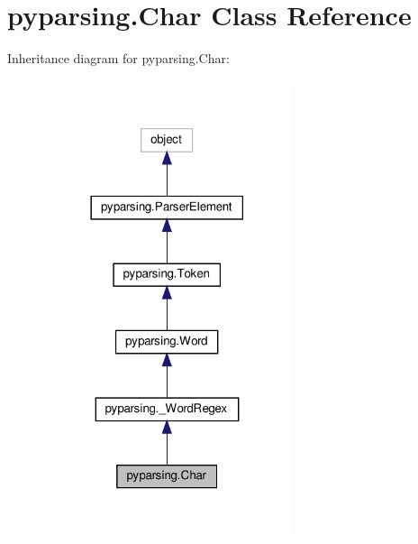 \hypertarget{classpyparsing_1_1Char}{}\section{pyparsing.\+Char Class Reference}
\label{classpyparsing_1_1Char}


Inheritance diagram for pyparsing.\+Char\+:
\nopagebreak
\begin{figure}[H]
\begin{center}
\leavevmode
\includegraphics[width=206pt]{classpyparsing_1_1Char__inherit__graph}
\end{center}
\end{figure}


